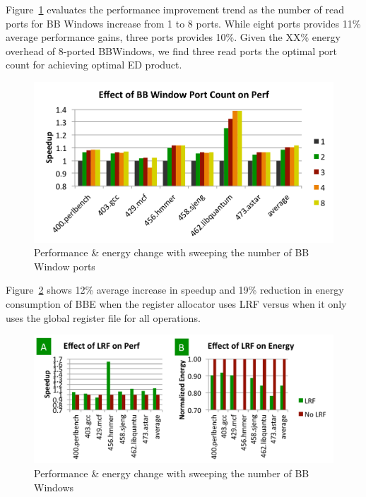 Figure~\ref{fig:bbWin_port} evaluates the performance improvement trend as the
number of read ports for BB Windows increase from 1 to 8 ports. While eight
ports provides 11\% average performance gains, three ports provides 10\%.  Given
the XX\% energy overhead of 8-ported BBWindows, we find three read ports the
optimal port count for achieving optimal ED product.
\begin{figure}[!htbp]
	\centering
	\includegraphics[width=1.0\columnwidth]{result/bbWin_port.pdf} 
    \caption{Performance \& energy change with sweeping the number of BB Window
    ports}
	\label{fig:bbWin_port}
\end{figure}

Figure~\ref{fig:lrf_effect} shows 12\% average increase in speedup and 19\%
reduction in energy consumption of BBE when the register allocator uses LRF
versus when it only uses the global register file for all operations.
\begin{figure}[!htbp]
	\centering
	\includegraphics[width=1.0\columnwidth]{result/lrf_effect.pdf} 
    \caption{Performance \& energy change with sweeping the number of BB Windows}
	\label{fig:lrf_effect}
\end{figure}


